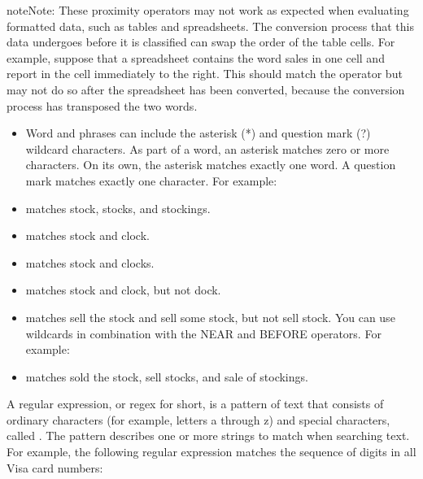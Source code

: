\documentclass[letterpaper,10pt,english]{sphinxmanual}
\begin{document}
\begin{sphinxadmonition}{note}{Note:}
These proximity operators may not work as expected when evaluating formatted data, such as tables and spreadsheets. The conversion process that this data undergoes before it is classified can swap the order of the table cells. For example, suppose that a spreadsheet contains the word sales in one cell and report in the cell immediately to the right. This should match the operator  but may not do so after the spreadsheet has been converted, because the conversion process has transposed the two words.
\end{sphinxadmonition}
\begin{itemize}
\item {} 
Word and phrases can include the asterisk (*) and question mark (?) wildcard characters. As part of a word, an asterisk matches zero or more characters. On its own, the asterisk matches exactly one word. A question mark matches exactly one character. For example:

\end{itemize}
\begin{itemize}
\item {} 
 matches stock, stocks, and stockings.

\item {} 
 matches stock and clock.

\item {} 
 matches stock and clocks.

\item {} 
 matches stock and clock, but not dock.

\item {} 
  matches sell the stock and sell some stock, but not sell stock. You can use  wildcards in combination with the NEAR and BEFORE operators. For example:

\item {} 
 matches sold the stock, sell stocks, and sale of stockings.

\end{itemize}


A regular expression, or regex for short, is a pattern of text that consists of ordinary characters (for example, letters a through z) and special characters, called
. The pattern describes one or more strings to match when searching text. For example, the following regular expression matches the sequence of digits
in all Visa card numbers:
\end{document}
